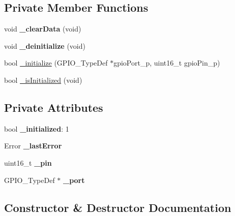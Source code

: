 \subsection*{Private Member Functions}
\begin{DoxyCompactItemize}
\item 
\hypertarget{class_gpio_a1335d7adece4c84dcac27da9d8db0690}{}void {\bfseries \+\_\+clear\+Data} (void)\label{class_gpio_a1335d7adece4c84dcac27da9d8db0690}

\item 
\hypertarget{class_gpio_a1de620134902313c8b73b64355d6a5f4}{}void {\bfseries \+\_\+deinitialize} (void)\label{class_gpio_a1de620134902313c8b73b64355d6a5f4}

\item 
bool \hyperlink{class_gpio_a297109bc058b535736ff05bc94cce678}{\+\_\+initialize} (G\+P\+I\+O\+\_\+\+Type\+Def $\ast$gpio\+Port\+\_\+p, uint16\+\_\+t gpio\+Pin\+\_\+p)
\item 
bool \hyperlink{class_gpio_ab9bc464ad94cdc5d15ad47b45d07ba12}{\+\_\+is\+Initialized} (void)
\end{DoxyCompactItemize}
\subsection*{Private Attributes}
\begin{DoxyCompactItemize}
\item 
\hypertarget{class_gpio_ac8d7e1f4c3fb55220e0d742a65d3f6f5}{}bool {\bfseries \+\_\+initialized}\+: 1\label{class_gpio_ac8d7e1f4c3fb55220e0d742a65d3f6f5}

\item 
\hypertarget{class_gpio_a0ffac9059f018d074d5833571f27a612}{}Error {\bfseries \+\_\+last\+Error}\label{class_gpio_a0ffac9059f018d074d5833571f27a612}

\item 
\hypertarget{class_gpio_ae8ca344ab7340e1ca018b0a87505354c}{}uint16\+\_\+t {\bfseries \+\_\+pin}\label{class_gpio_ae8ca344ab7340e1ca018b0a87505354c}

\item 
\hypertarget{class_gpio_a347443eb64d58a346e143472fc253a20}{}G\+P\+I\+O\+\_\+\+Type\+Def $\ast$ {\bfseries \+\_\+port}\label{class_gpio_a347443eb64d58a346e143472fc253a20}

\end{DoxyCompactItemize}


\subsection{Constructor \& Destructor Documentation}
\hypertarget{class_gpio_af6c85b01275e46b59ab0fd53b267a1b0}{}
